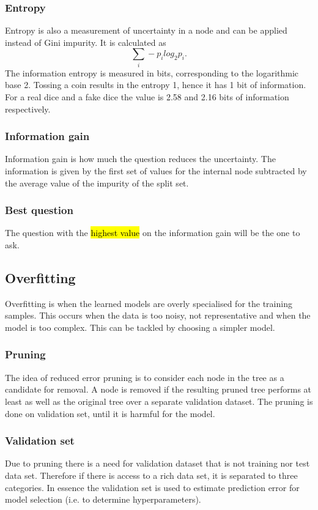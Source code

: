 \documentclass[12pt]{article}
\numberwithin{equation}{section}
\begin{document}
\subsubsection{Entropy}
Entropy is also a measurement of uncertainty in a node and can be applied instead of Gini impurity. It is calculated as
\begin{equation}
    \sum_i -p_ilog_2 p_i.
\end{equation}
The information entropy is measured in bits, corresponding to the logarithmic base 2. Tossing a coin results in the entropy 1, hence it has 1 bit of information. For a real dice and a fake dice the value is 2.58 and 2.16 bits of information respectively.

\subsubsection{Information gain}
Information gain is how much the question reduces the uncertainty. The information is given by the first set of values for the internal node subtracted by the average value of the impurity of the split set. 

\subsubsection{Best question}
The question with the \hl{highest value} on the information gain will be the one to ask.

\subsection{Overfitting}
Overfitting is when the learned models are overly specialised for the training samples. This occurs when the data is too noisy, not representative and when the model is too complex. This can be tackled by choosing a simpler model.

\subsubsection{Pruning}
The idea of reduced error pruning is to consider each node in the tree as a candidate for removal. A node is removed if the resulting pruned tree performs at least as well as the original tree over a separate validation dataset. The pruning is done on validation set, until it is harmful for the model.

\subsubsection{Validation set}
Due to pruning there is a need for validation dataset that is not training nor test data set. Therefore if there is access to a rich data set, it is separated to three categories. In essence the validation set is used to estimate prediction error for model selection (i.e. to determine hyperparameters).
\end{document}
